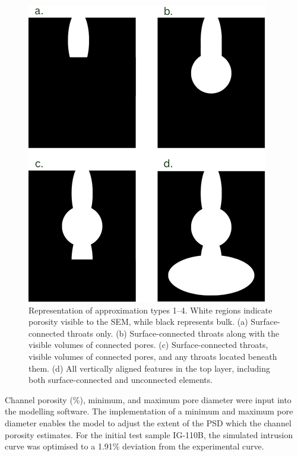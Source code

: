 \documentclass[review]{elsarticle}
\begin{document}
\begin{figure}
  \centering
  \includegraphics[width=0.9\columnwidth]{./Media/bradapproximationtypesv2.png}
  \caption{Representation of approximation types 1–4. White regions indicate
   porosity visible to the SEM, while black represents bulk.
    (a) Surface-connected throats only. (b) Surface-connected throats along
     with the visible volumes of connected pores. (c) Surface-connected throats,
      visible volumes of connected pores, and any throats located beneath them.
      (d) All vertically aligned features in the top layer, including both
       surface-connected and unconnected elements.}
  \label{fig:pxapproxtypes}
\end{figure}

  Channel porosity (\%), minimum, and maximum pore diameter were input into the
  modelling software. The implementation of a minimum and maximum pore diameter
  enables the  model  to adjust the extent of the PSD which the channel porosity
  estimates. For the initial test sample IG-110B, the simulated intrusion curve
  was optimised to a 1.91\% deviation from the experimental curve.
\end{document}
